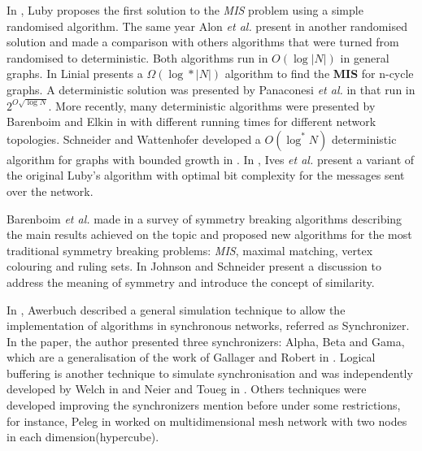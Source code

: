 In \cite{luby1986simple}, Luby proposes the first solution to the \textit{MIS} problem using a simple randomised algorithm. The same year Alon \textit{et al.} present in \cite{alon1986fast} another randomised solution and made a comparison with others algorithms that were turned from randomised to deterministic. Both algorithms run in $O(\log |N|)$ in general graphs. In \cite{linial1992locality} Linial presents a $\Omega(\log* |N|)$ algorithm to find the \textbf{MIS} for n-cycle graphs. A deterministic solution was presented by Panaconesi \textit{et al.} in \cite{panconesi1996complexity} that run in $2^{O\sqrt{\log N}}$. More recently, many deterministic algorithms were presented by Barenboim and Elkin in \cite{barenboim2010sublogarithmic} with different running times for different network topologies. Schneider and Wattenhofer developed a $O(\log^* N)$ deterministic algorithm for graphs with bounded growth in \cite{barenboim2010sublogarithmic}. In \cite{yves2009optimal}, Ives \textit{et al.} present a variant of the original Luby's algorithm with optimal bit complexity for the messages sent over the network. 

 Barenboim \textit{et al.} made in \cite{barenboim2016locality} a survey of symmetry breaking algorithms describing the main results achieved on the topic and proposed new algorithms for the most traditional symmetry breaking problems: \textit{MIS}, maximal matching, vertex colouring and ruling sets. In \cite{johnson1985symmetry} Johnson and Schneider present a discussion to address the meaning of symmetry and introduce the concept of similarity.
 
In \cite{awerbuch1985complexity}, Awerbuch described a general simulation technique to allow the implementation of algorithms in synchronous networks, referred as Synchronizer. In the paper, the author presented three synchronizers: Alpha, Beta and Gama, which are a generalisation of the work of Gallager and Robert in \cite{gallager1982distributed}. Logical buffering is another technique to simulate synchronisation and was independently developed by Welch in \cite{welch1987simulating} and Neier and Toueg in \cite{neiger1993simulating}. Others techniques were developed improving the synchronizers mention before under some restrictions, for instance, Peleg in \cite{peleg1989optimal} worked on multidimensional mesh network with two nodes in each dimension(hypercube).